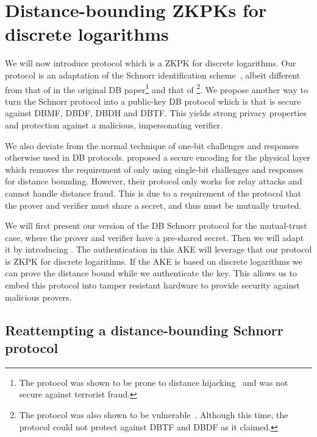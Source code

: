 \section{Distance-bounding \aclp*{ZKPK} for discrete logarithms}%
\label{DB-anon-cred}

We will now introduce  protocol which is a \ac{ZKPK} for discrete 
logarithms.
Our protocol is an adaptation of the Schnorr identification 
scheme~\cite{Schnorr}, albeit different from that of 
\textcite{DistanceBounding} in the original \ac{DB} paper\footnote{%
  The \citeauthor{DistanceBounding} protocol was shown to be prone to distance 
  hijacking~\cite{DistanceHijacking,TamarinDB} and was not secure against 
  terrorist fraud.
} and that of \textcite{Bussard-Bagga}\footnote{%
  The \citeauthor{Bussard-Bagga} protocol was also shown to be 
  vulnerable~\cite{Bussard-Bagga-attack}.
  Although this time, the protocol could not protect against \ac{DBTF} and 
  \ac{DBDF} as it claimed.
}.
We propose another way to turn the Schnorr protocol into a public-key \ac{DB} 
protocol which is  that is secure against \ac{DBMF}, \ac{DBDF}, 
\ac{DBDH} and \ac{DBTF}.
This yields strong privacy properties and protection against a malicious, 
impersonating verifier.

We also deviate from the normal technique of one-bit challenges and responses 
otherwise used in \ac{DB} protocols.
\Textcite{UWBPR} proposed a secure encoding for the physical 
layer which removes the requirement of only using single-bit challenges and 
responses for distance bounding.
However, their protocol only works for relay attacks and cannot handle distance 
fraud.
This is due to a requirement of the protocol that the prover and verifier must 
share a secret, and thus must be mutually trusted.

We will first present our version of the \ac{DB} Schnorr protocol for the 
mutual-trust case, where the prover and verifier have a pre-shared secret.
Then we will adapt it by introducing .
The authentication in this \ac{AKE} will leverage that our protocol is  
\ac{ZKPK} for discrete logarithms.
If the \ac{AKE} is based on discrete logarithms we can prove the distance bound 
while we authenticate the key.
This allows us to embed this protocol into tamper resistant hardware to provide 
security against malicious provers.


\subsection{Reattempting a distance-bounding Schnorr protocol}%
\label{DB-Schnorr}

